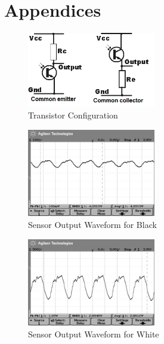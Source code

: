 \documentclass{article}
\begin{document}
\clearpage

\section{Appendices}

\begin{figure}[!h]
\centerline{\includegraphics[width=0.5\textwidth]{transistor-config}}
\caption{Transistor Configuration}
\label{fig:transconfig}
\end{figure}

\begin{figure}[!h]
\centerline{\includegraphics[width=0.5\textwidth]{Waveform-BlackLine}}
\caption{Sensor Output Waveform for Black}
\label{fig:waveblack}
\end{figure}

\begin{figure}[!h]
\centerline{\includegraphics[width=0.5\textwidth]{Waveform-White}}
\caption{Sensor Output Waveform for White}
\label{fig:wavewhite}
\end{figure}
\end{document}
